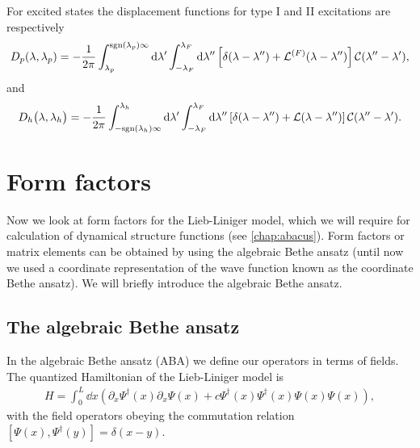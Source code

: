 \documentclass[11pt, a4paper]{report} %
\begin{document}
For excited states the displacement functions for type I and II excitations are respectively~\cite{Caux2015}
\begin{align}
	D_p\qty(\lambda, \lambda_p) = -\frac{1}{2\pi} \int_{\lambda_p}^{\textrm{sgn}\qty(\lambda_p)\infty} \dd \lambda' \int_{-\lambda_F}^{\lambda_F} \dd  \lambda'' \left[\delta\qty(\lambda-\lambda'') + \mathcal{L}^{(F)}\qty(\lambda-\lambda'') \right]\mathcal{C}\qty(\lambda''-\lambda'),
\end{align}
and
\begin{align}
	D_h\qty\big(\lambda, \lambda_h) = -\frac{1}{2\pi} \int_{-\textrm{sgn}(\lambda_h)\infty}^{\lambda_h} \dd \lambda' \int_{-\lambda_F}^{\lambda_F} \dd \lambda'' \left[\delta\qty(\lambda-\lambda'') + \mathcal{L}\qty(\lambda - \lambda'') \right]\mathcal{C}\qty(\lambda''-\lambda').
\end{align}


\section{Form factors}
Now we look at form factors for the Lieb-Liniger model, which we will require for calculation of dynamical structure functions (see \cref{chap:abacus}).
Form factors or matrix elements can be obtained by using the algebraic Bethe ansatz (until now we used a coordinate representation of the wave function known as the coordinate Bethe ansatz).
We will briefly introduce the algebraic Bethe ansatz. 

\subsection{The algebraic Bethe ansatz}

In the algebraic Bethe ansatz (ABA) we define our operators in terms of fields.
The quantized Hamiltonian of the Lieb-Liniger model is
\begin{align}
  \label{eq:30}
  H = \int_0^L \dd x \left(\partial_x \Psi^{\dag}(x) \partial_x \Psi(x) + c \Psi^{\dag}(x)\Psi^{\dag}(x)\Psi(x)\Psi(x)\right),
\end{align}
with the field operators obeying the commutation relation \([\Psi(x),\Psi^{\dag}(y)] = \delta(x-y)\).
\end{document}
